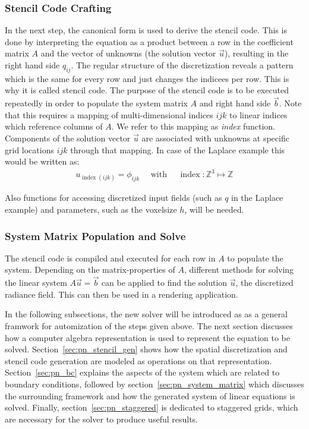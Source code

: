 \subsubsection*{Stencil Code Crafting}
In the next step, the canonical form is used to derive the stencil code. This is done by interpreting the equation as a product between a row in the coefficient matrix $A$ and the vector of unknowns (the solution vector $\vec{u}$), resulting in the right hand side $q_{ij}$. The regular structure of the discretization reveals a pattern which is the same for every row and just changes the indicees per row. This is why it is called stencil code.
The purpose of the stencil code is to be executed repeatedly in order to populate the system matrix $A$ and right hand side $\vec{b}$. Note that this requires a mapping of multi-dimensional indices $ijk$ to linear indices which reference columns of $A$. We refer to this mapping as \emph{index} function. Components of the solution vector $\vec{u}$ are associated with unknowns at specific grid locations $ijk$ through that mapping. In case of the Laplace example this would be written as:
\begin{align}
u_{\operatorname{index}\left(ijk\right)} = \phi_{ijk}\quad\text{ with }\quad \operatorname{index}: \mathbb{Z}^3\mapsto\mathbb{Z}
\label{eq:pn_index_mapping}
\end{align}

Also functions for accessing discretized input fields (such as $q$ in the Laplace example) and parameters, such as the voxelsize $h$, will be needed.

\subsubsection*{System Matrix Population and Solve}
The stencil code is compiled and executed for each row in $A$ to populate the system. Depending on the matrix-properties of $A$, different methods for solving the linear system $A\vec{u}=\vec{b}$ can be applied to find the solution $\vec{u}$, the discretized radiance field. This can then be used in a rendering application.

In the following subsections, the new solver will be introduced as as a general framwork for automization of the steps given above. The next section discusses how a computer algebra representation is used to represent the equation to be solved. Section~\ref{sec:pn_stencil_gen} shows how the spatial discretization and stencil code generation are modeled as operations on that representation. Section~\ref{sec:pn_bc} explains the aspects of the system which are related to boundary conditions, followed by section~\ref{sec:pn_system_matrix} which discusses the surrounding framework and how the generated system of linear equations is solved. Finally, section~\ref{sec:pn_staggered} is dedicated to staggered grids, which are necessary for the solver to produce useful results.

